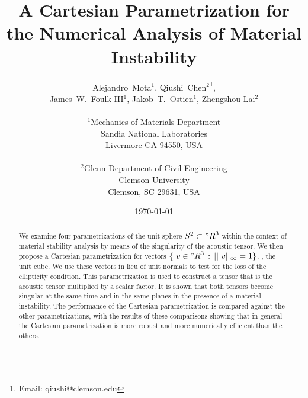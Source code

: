 \documentclass[12pt]{article}
\numberwithin{equation}{section}
\begin{document}





\title{A Cartesian Parametrization for the Numerical Analysis of
  Material Instability}

\author{
  \Large Alejandro~Mota$^1$,
  Qiushi~Chen$^2$\thanks{Email: qiushi@clemson.edu},
  \\
  \Large James~W.~Foulk {III}$^1$,
  Jakob~T.~Ostien$^1$, Zhengshou Lai$^2$
  \\
  \\
  $^1$Mechanics of Materials Department\\
  Sandia National Laboratories\\
  Livermore CA 94550, USA\\
  \\
  $^2$Glenn Department of Civil Engineering\\
  Clemson University\\
  Clemson, SC 29631, USA\\
}

\date{\today}

\maketitle

\begin{abstract}
  We examine four parametrizations of the unit sphere $S^2 \subset
  {"R}^3$ within the context of material stability analysis by means
  of the singularity of the acoustic tensor. We then propose a
  Cartesian parametrization for vectors $\{~v \in {"R}^3 \, : \,
  ||~v||_{\infty} = 1\}$, \ie, the unit cube. We use these vectors in
  lieu of unit normals to test for the loss of the ellipticity
  condition. This parametrization is used to construct a tensor that
  is the acoustic tensor multiplied by a scalar factor. It is shown
  that both tensors become singular at the same time and in the same
  planes in the presence of a material instability. The performance of
  the Cartesian parametrization is compared against the other
  parametrizations, with the results of these comparisons showing that
  in general the Cartesian parametrization is more robust and more
  numerically efficient than the others.
\end{abstract}
\end{document}
